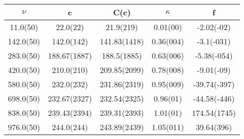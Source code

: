 \begin{table}[H]
	\centering
	\begin{tabular}{ccccc}
		$\nu$ & c & C(c) & $\kappa$ & f\\
		\hline
		11.0(50) & 22.0(22) & 21.9(219) & 0.01(00) & -2.02(-02)	\\
		142.0(50) & 142.0(142) & 141.83(1418) & 0.36(004) & -3.1(-031)	\\
		283.0(50) & 188.67(1887) & 188.5(1885) & 0.63(006) & -5.38(-054)	\\
		420.0(50) & 210.0(210) & 209.85(2099) & 0.78(008) & -9.01(-09)	\\
		580.0(50) & 232.0(232) & 231.86(2319) & 0.95(009) & -39.74(-397)	\\
		698.0(50) & 232.67(2327) & 232.54(2325) & 0.96(01) & -44.58(-446)	\\
		838.0(50) & 239.43(2394) & 239.31(2393) & 1.01(01) & 174.54(1745)	\\
		976.0(50) & 244.0(244) & 243.89(2439) & 1.05(011) & 39.64(396)	\\
	\end{tabular}
\end{table}